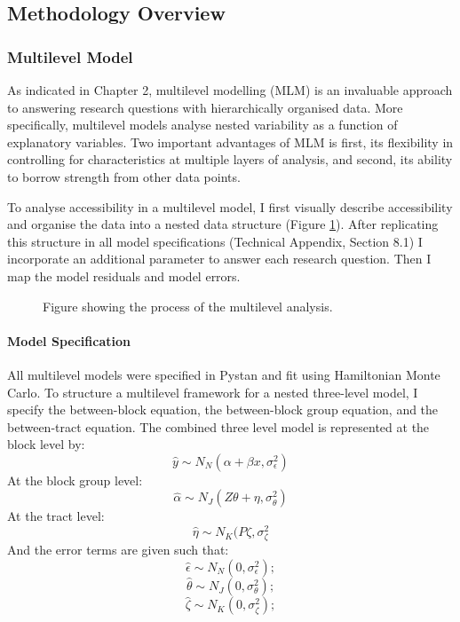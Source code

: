 \documentclass[a4paper,UKenglish]{lipics-v2018}
\begin{document}
\subsection{Methodology Overview}
\subsubsection{Multilevel Model}
As indicated in Chapter 2, multilevel modelling (MLM) is an invaluable approach to answering research questions with hierarchically organised data. More specifically, multilevel models analyse nested variability as a function of explanatory variables. Two important advantages of MLM is first, its flexibility in controlling for characteristics at multiple layers of analysis, and second, its ability to borrow strength from other data points. 

To analyse accessibility in a multilevel model, I first visually describe accessibility and organise the data into a nested data structure (Figure \ref{fig:MLM_diagram}). After replicating this structure in all model specifications (Technical Appendix, Section 8.1) I incorporate an additional parameter to answer each research question. Then I map the model residuals and model errors. 

\begin{figure}[ht]
    \centering
    \caption[Multilevel modelling process]{Figure showing the process of the multilevel analysis.} 
    \label{fig:MLM_diagram}
\end{figure}

\paragraph{Model Specification}
All multilevel models were specified in Pystan and fit using Hamiltonian Monte Carlo. To structure a multilevel framework for a nested three-level model, I specify the between-block equation, the between-block group equation, and the between-tract equation. The combined three level model is represented at the block level by: 
\begin{equation} \label{eq1}
\hat{y} \sim N_N(\alpha + \beta x, 	\sigma^2_\epsilon)
\end{equation}
At the block group level:   
\begin{equation} \label{eq2}
\hat{\alpha} \sim N_J(Z \theta + \eta, \sigma^2_\theta)
\end{equation}
At the tract level:
\begin{equation} \label{eq3}
\hat{\eta} \sim N_K(P\zeta, \sigma^2_\zeta
\end{equation}
And the error terms are given such that: 
\[\hat{\epsilon} \sim N_N(0, \sigma^2_\epsilon);\] 
\[\hat{\theta} \sim N_J(0, \sigma^2_\theta);\]
\[\hat{\zeta} \sim N_K(0, \sigma^2_\zeta);\] 
\end{document}
